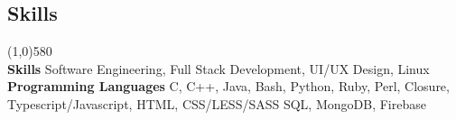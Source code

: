 \documentclass[9pt]{article}
\begin{document}
  \vspace{-16pt}
  \subsection*{Skills}
    \vspace{-16pt}
    \line(1,0){580}\\
    \textbf{Skills}
    Software Engineering,
    Full Stack Development,
    UI/UX Design,
    Linux
    \\
    \textbf{Programming Languages}
    C,
    C++,
    Java,
    Bash,
    Python,
    Ruby,
    Perl,
    Closure,
    Typescript/Javascript,
    HTML,
    CSS/LESS/SASS
    SQL,
    MongoDB,
    Firebase
    \\
\end{document}
